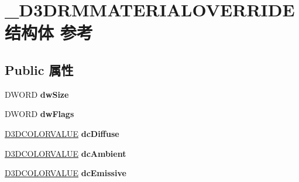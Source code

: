\hypertarget{struct___d3_d_r_m_m_a_t_e_r_i_a_l_o_v_e_r_r_i_d_e}{}\section{\+\_\+\+D3\+D\+R\+M\+M\+A\+T\+E\+R\+I\+A\+L\+O\+V\+E\+R\+R\+I\+D\+E结构体 参考}
\label{struct___d3_d_r_m_m_a_t_e_r_i_a_l_o_v_e_r_r_i_d_e}
\subsection*{Public 属性}
\begin{DoxyCompactItemize}
\item 
\mbox{\label{struct___d3_d_r_m_m_a_t_e_r_i_a_l_o_v_e_r_r_i_d_e_a2c293e610c127cc0f3338299dbda63d1}} 
D\+W\+O\+RD {\bfseries dw\+Size}
\item 
\mbox{\label{struct___d3_d_r_m_m_a_t_e_r_i_a_l_o_v_e_r_r_i_d_e_af4f8714c0772cb856221aa35c5af546b}} 
D\+W\+O\+RD {\bfseries dw\+Flags}
\item 
\mbox{\label{struct___d3_d_r_m_m_a_t_e_r_i_a_l_o_v_e_r_r_i_d_e_abf6e1c7608c7eb10c66426e5e26ce9b1}} 
\hyperlink{struct___d3_d_c_o_l_o_r_v_a_l_u_e}{D3\+D\+C\+O\+L\+O\+R\+V\+A\+L\+UE} {\bfseries dc\+Diffuse}
\item 
\mbox{\label{struct___d3_d_r_m_m_a_t_e_r_i_a_l_o_v_e_r_r_i_d_e_a9d70100b9b1426fc4428e00f0b724da9}} 
\hyperlink{struct___d3_d_c_o_l_o_r_v_a_l_u_e}{D3\+D\+C\+O\+L\+O\+R\+V\+A\+L\+UE} {\bfseries dc\+Ambient}
\item 
\mbox{\label{struct___d3_d_r_m_m_a_t_e_r_i_a_l_o_v_e_r_r_i_d_e_a5b3413d8d88c6f60a0eb034bc7c9f6ef}} 
\hyperlink{struct___d3_d_c_o_l_o_r_v_a_l_u_e}{D3\+D\+C\+O\+L\+O\+R\+V\+A\+L\+UE} {\bfseries dc\+Emissive}
\item 
\mbox{\label{struct___d3_d_r_m_m_a_t_e_r_i_a_l_o_v_e_r_r_i_d_e_aeec1710c0844e105c02511ff3b3a6289}} 

\end{DoxyCompactItemize}
